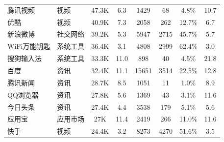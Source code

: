 \begin{ThreePartTable}
\begin{longtable}{l l c c c c c c}
        \rowcolor{gray!15} 腾讯视频     & 视频       & 47.3K                      & 6.3                        & 1429           & 68                         & 4.8\%        & 10.7                       \\
        优酷                            & 视频       & 40.9K                      & 7.3                        & 2058           & 262                        & 12.7\%       & 6.7                        \\
        新浪微博                        & 社交网络   & 39.2K                      & 5.3                        & 5947           & 2715                       & 45.7\%       & 5.7                        \\
        \rowcolor{gray!15} WiFi万能钥匙 & 系统工具   & 36.4K                      & 3.1                        & 4808           & 2999                       & 62.4\%       & 3.0                        \\
        搜狗输入法                      & 系统工具   & 33.3K                      & 11.0                       & 898            & 40                         & 4.5\%        & 21.8                       \\
        \rowcolor{gray!15} 百度         & 资讯       & 32.4K                      & 11.1                       & 15651          & 3514                       & 22.5\%       & 12.8                       \\
        腾讯新闻                        & 资讯       & 28.7K                      & 8.5                        & 1051           & 11                         & 1.0\%        & 8.9                        \\
        \rowcolor{gray!15} QQ浏览器     & 资讯       & 27.8K                      & 5.6                        & 1369           & 43                         & 3.1\%        & 11.6                       \\
        今日头条                        & 资讯       & 27.4K                      & 4.4                        & 3538           & 179                        & 5.1\%        & 5.6                        \\
        \rowcolor{gray!15} 应用宝       & 应用市场   & 27K                        & 11.4                       & 2419           & 266                        & 11.0\%       & 11.6                       \\
        快手                            & 视频       & 24.4K                      & 3.2                        & 8273           & 4270                       & 51.6\%       & 3.5                        \\

\end{longtable}
\end{ThreePartTable}
